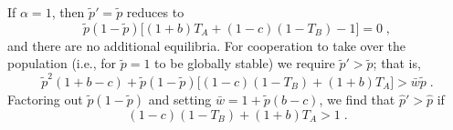 \documentclass[12pt]{extarticle}
\begin{document}
{If $\alpha=1$, then $\tilde{p}'= \tilde{p}$ reduces to
\begin{equation}
\tilde{p}(1-\tilde{p})\big[(1+b)T_A + (1-c)(1-T_B)-1\big] = 0 \;,
\end{equation}
and there are no additional equilibria.
For cooperation to take over the population (i.e., for $\tilde{p}=1$ to be globally stable) we require $\tilde{p}'>\tilde{p}$; that is,
\begin{equation}
  \tilde{p}^2 (1+b-c) + \tilde{p}(1-\tilde{p}) \big[(1-c) (1 - T_B) + (1+b)T_A\big] 
  > \bar{w}\tilde{p} \;.
\end{equation}
Factoring out $\tilde{p}(1-\tilde{p})$ and setting $\bar{w} = 1 + \tilde{p}(b-c)$, we find that $\hat{p}'>\hat{p}$ if
\begin{equation} \label{eq:vert_hori_alpha1_condition_proof}
  (1-c) (1 - T_B) + (1+b)T_A > 1 \;.
\end{equation}
\\

}
\end{document}
